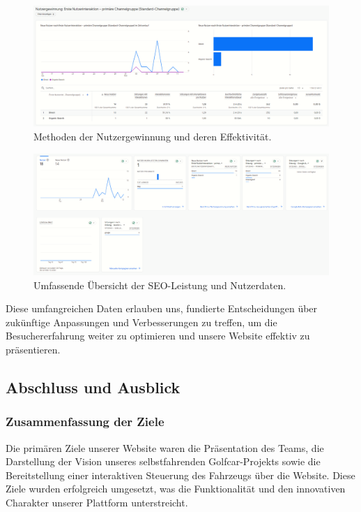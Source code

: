 \newpage

\begin{figure}[h]
    \centering
    \includegraphics[width=\textwidth]{Resources/SEO_nutzergewinnung.png}
    \caption{Methoden der Nutzergewinnung und deren Effektivität.}
\end{figure}

\begin{figure}[h]
    \centering
    \includegraphics[width=\textwidth]{Resources/SEO_uebersicht.png}
    \caption{Umfassende Übersicht der SEO-Leistung und Nutzerdaten.}
\end{figure}

Diese umfangreichen Daten erlauben uns, fundierte Entscheidungen über zukünftige Anpassungen und Verbesserungen zu treffen, um die Besuchererfahrung weiter zu optimieren und unsere Website effektiv zu präsentieren.

\newpage

\subsection{Abschluss und Ausblick}

\subsubsection{Zusammenfassung der Ziele}
Die primären Ziele unserer Website waren die Präsentation des Teams, die Darstellung der Vision unseres selbstfahrenden Golfcar-Projekts sowie die Bereitstellung einer interaktiven Steuerung des Fahrzeugs über die Website. Diese Ziele wurden erfolgreich umgesetzt, was die Funktionalität und den innovativen Charakter unserer Plattform unterstreicht.

